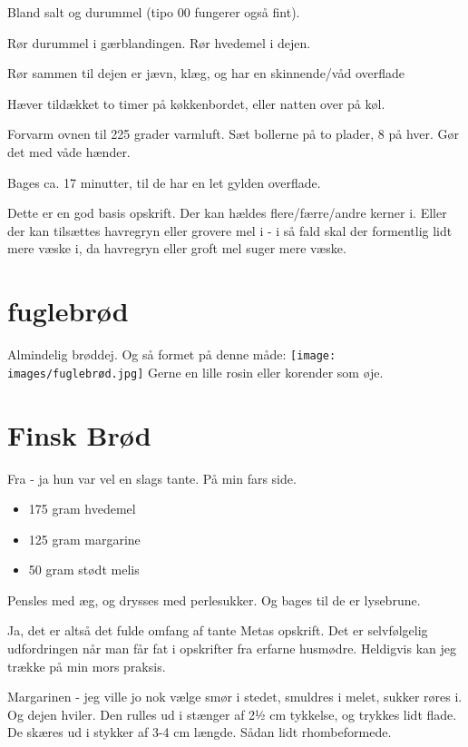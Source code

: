 \documentclass[
]{book}
\providecommand{\tightlist}{%
  \setlength{\itemsep}{0pt}\setlength{\parskip}{0pt}}
\begin{document}
Bland salt og durummel (tipo 00 fungerer også fint).

Rør durummel i gærblandingen.
Rør hvedemel i dejen.

Rør sammen til dejen er jævn, klæg, og har en skinnende/våd
overflade

Hæver tildækket to timer på køkkenbordet, eller natten over
på køl.

Forvarm ovnen til 225 grader varmluft. Sæt bollerne på to
plader, 8 på hver. Gør det med våde hænder.

Bages ca. 17 minutter, til de har en let gylden overflade.

Dette er en god basis opskrift. Der kan hældes flere/færre/andre
kerner i. Eller der kan tilsættes havregryn eller grovere
mel i - i så fald skal der formentlig lidt mere væske i, da
havregryn eller groft mel suger mere væske.

\section{fuglebrød}\label{fuglebruxf8d}

Almindelig brøddej. Og så formet på denne måde:
\texttt{[image: images/fuglebrød.jpg]}
Gerne en lille rosin eller korender som øje.

\section{Finsk Brød}\label{finsk-bruxf8d}

Fra - ja hun var vel en slags tante. På min fars side.

\begin{itemize}
\tightlist
\item
  175 gram hvedemel
\item
  125 gram margarine
\item
  50 gram stødt melis
\end{itemize}

Pensles med æg, og drysses med perlesukker. Og bages til de er lysebrune.

Ja, det er altså det fulde omfang af tante Metas opskrift. Det er selvfølgelig udfordringen når man får fat i opskrifter fra erfarne husmødre. Heldigvis kan jeg trække på min mors praksis.

Margarinen - jeg ville jo nok vælge smør i stedet, smuldres i melet, sukker røres i. Og dejen hviler. Den rulles ud i stænger af 2½ cm tykkelse, og trykkes lidt flade. De skæres ud i stykker af 3-4 cm længde. Sådan lidt rhombeformede.
\end{document}
